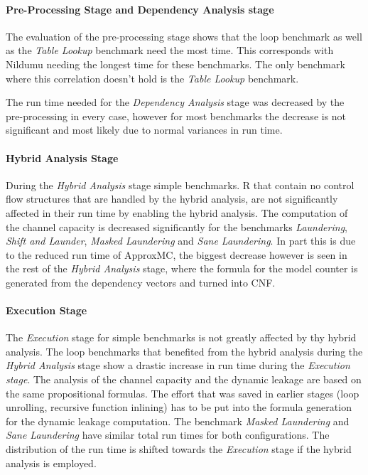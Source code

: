 \paragraph{Pre-Processing Stage and Dependency Analysis stage}
The evaluation of the pre-processing stage shows that the loop benchmark as well as the \emph{Table Lookup} benchmark need the most time. This corresponds with Nildumu needing the longest time for these benchmarks. The only benchmark where this correlation doesn't hold is the \emph{Table Lookup} benchmark.

The run time needed for the \emph{Dependency Analysis} stage was decreased by the pre-processing in every case, however for most benchmarks the decrease is not significant and most likely due to normal variances in run time.

\paragraph{Hybrid Analysis Stage}
During the \emph{Hybrid Analysis} stage simple benchmarks. R that contain no control flow structures that are handled by the hybrid analysis, are not significantly affected in their run time by enabling the hybrid analysis. The computation of the channel capacity is decreased significantly for the benchmarks \emph{Laundering}, \emph{Shift and Launder}, \emph{Masked Laundering} and \emph{Sane Laundering}. In part this is due to the reduced run time of ApproxMC, the biggest decrease however is seen in the rest of the \emph{Hybrid Analysis} stage, where the formula for the model counter is generated from the dependency vectors and turned into CNF.

\paragraph{Execution Stage}
The \emph{Execution} stage for simple benchmarks is not greatly affected by thy hybrid analysis. The loop benchmarks that benefited from the hybrid analysis during the \emph{Hybrid Analysis} stage show a drastic increase in run time during the \emph{Execution stage}. The analysis of the channel capacity and the dynamic leakage are based on the same propositional formulas. The effort that was saved in earlier stages (loop unrolling, recursive function inlining) has to be put into the formula generation for the dynamic leakage computation. The benchmark \emph{Masked Laundering} and \emph{Sane Laundering} have similar total run times for both configurations. The distribution of the run time is shifted towards the \emph{Execution} stage if the hybrid analysis is employed.

